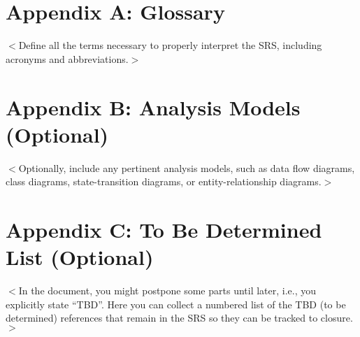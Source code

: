 \documentclass{scrreprt}
\begin{document}
\section{Appendix A: Glossary}
$<$Define all the terms necessary to properly interpret the SRS, including 
acronyms and abbreviations.$>$

\section{Appendix B: Analysis Models (Optional)}
$<$Optionally, include any pertinent analysis models, such as data flow diagrams, class diagrams, state-transition diagrams, or entity-relationship diagrams.$>$

\section{Appendix C: To Be Determined List (Optional)}
$<$In the document, you might postpone some parts until later, i.e., you explicitly state ``TBD''. Here you can collect a numbered list of the TBD (to be determined) references that remain in the SRS so they can be tracked to closure.$>$
\end{document}
